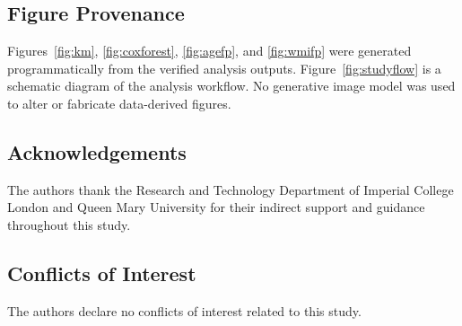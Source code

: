 \documentclass[a4paper,12pt]{article}
\begin{document}
\subsection*{Figure Provenance}
Figures~\ref{fig:km}, \ref{fig:coxforest}, \ref{fig:agefp}, and \ref{fig:wmifp} were generated programmatically from the verified analysis outputs. Figure~\ref{fig:studyflow} is a schematic diagram of the analysis workflow. No generative image model was used to alter or fabricate data-derived figures.

\subsection*{Acknowledgements}
The authors thank the Research and Technology Department of Imperial College London and Queen Mary University for their indirect support and guidance throughout this study.

\subsection*{Conflicts of Interest}
The authors declare no conflicts of interest related to this study.
\end{document}
